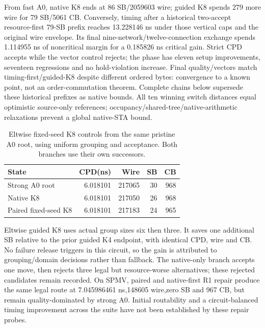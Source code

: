 \documentclass[conference,10pt]{IEEEtran}
\begin{document}
From fast A0, native K8 ends at 86 SB/2059603 wire; guided K8 spends 279 more wire for 79 SB/5061 CB. Conversely, timing after a historical two-accept resource-first 79-SB prefix reaches 13.228146 ns under those vertical caps and the original wire envelope. Its final nine-network/twelve-connection exchange spends 1.114955 ns of noncritical margin for a 0.185826 ns critical gain. Strict CPD accepts while the vector control rejects; the phase has eleven setup improvements, seventeen regressions and no hold-violation increase. Final quality/vectors match timing-first/guided-K8 despite different ordered bytes: convergence to a known point, not an order-commutation theorem. Complete chains below supersede these historical prefixes as native bounds. All ten winning switch distances equal optimistic source-only references; occupancy/shared-tree/native-arithmetic relaxations prevent a global native-STA bound.

\begin{table}[t]
\centering\caption{Eltwise fixed-seed K8 controls from the same pristine A0 root, using uniform grouping and acceptance. Both branches use their own successors.}
\label{tab:eltwise}
\small
\begin{tabular}{lrrrr}\hline
State & CPD(ns) & Wire & SB & CB\\\hline
Strong A0 root &6.018101&217065&30&968\\
Native K8 &6.018101&217050&26&968\\
Paired fixed-seed K8 &6.018101&217183&24&965\\\hline
\end{tabular}
\end{table}
Eltwise guided K8 uses actual group sizes six then three. It saves one additional SB relative to the prior guided K4 endpoint, with identical CPD, wire and CB. No failure release triggers in this circuit, so the gain is attributed to grouping/domain decisions rather than fallback. The native-only branch accepts one move, then rejects three legal but resource-worse alternatives; these rejected candidates remain recorded. On SPMV, paired and native-first R1 repair produce the same legal route at 7.045986461 ns,148605 wire,zero SB and 967 CB, but remain quality-dominated by strong A0. Initial routability and a circuit-balanced timing improvement across the suite have not been established by these repair probes.
\end{document}
